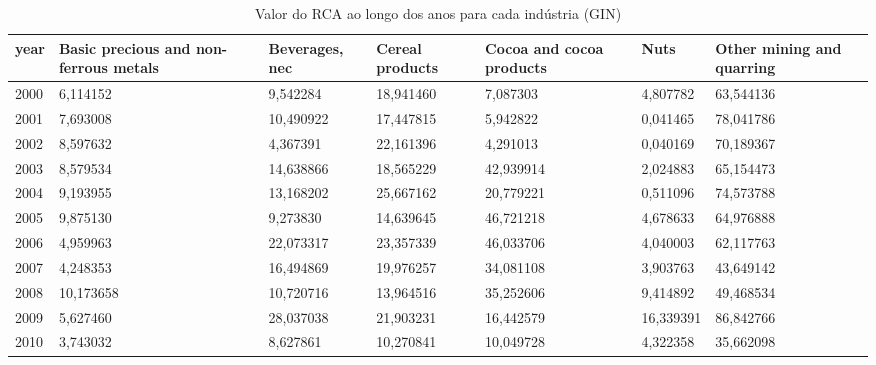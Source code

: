 \begin{table}
\centering
\caption{Valor do RCA ao longo dos anos para cada indústria (GIN)}
\begin{tabular}{p{1cm}p{2cm}p{2cm}p{2cm}p{2cm}p{2cm}p{2cm}}
\toprule
 year &  Basic precious and non-ferrous metals &  Beverages, nec &  Cereal products &  Cocoa and cocoa products &      Nuts &  Other mining and quarring \\
\midrule
 2000 &                               6,114152 &        9,542284 &        18,941460 &                  7,087303 &  4,807782 &                  63,544136 \\
 2001 &                               7,693008 &       10,490922 &        17,447815 &                  5,942822 &  0,041465 &                  78,041786 \\
 2002 &                               8,597632 &        4,367391 &        22,161396 &                  4,291013 &  0,040169 &                  70,189367 \\
 2003 &                               8,579534 &       14,638866 &        18,565229 &                 42,939914 &  2,024883 &                  65,154473 \\
 2004 &                               9,193955 &       13,168202 &        25,667162 &                 20,779221 &  0,511096 &                  74,573788 \\
 2005 &                               9,875130 &        9,273830 &        14,639645 &                 46,721218 &  4,678633 &                  64,976888 \\
 2006 &                               4,959963 &       22,073317 &        23,357339 &                 46,033706 &  4,040003 &                  62,117763 \\
 2007 &                               4,248353 &       16,494869 &        19,976257 &                 34,081108 &  3,903763 &                  43,649142 \\
 2008 &                              10,173658 &       10,720716 &        13,964516 &                 35,252606 &  9,414892 &                  49,468534 \\
 2009 &                               5,627460 &       28,037038 &        21,903231 &                 16,442579 & 16,339391 &                  86,842766 \\
 2010 &                               3,743032 &        8,627861 &        10,270841 &                 10,049728 &  4,322358 &                  35,662098 \\

\end{tabular}
\end{table}

